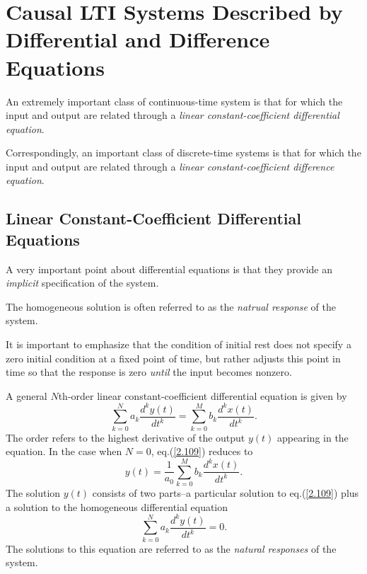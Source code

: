 \documentclass[a4paper,twoside]{book}
\begin{document}
\section{Causal LTI Systems Described by Differential and Difference Equations}

An extremely important class of continuous-time system is that for which the input and output are related through a \textit{linear constant-coefficient differential equation}.

Correspondingly, an important class of discrete-time systems is that for which the input and output are related through a \textit{linear constant-coefficient difference equation}.

\subsection{Linear Constant-Coefficient Differential Equations}

A very important point about differential equations is that they provide an \textit{implicit} specification of the system.

The homogeneous solution is often referred to as the \textit{natrual response} of the system.

It is important to emphasize that the condition of initial rest does not specify a zero initial condition at a fixed point of time, but rather adjusts this point in time so that the response is zero \textit{until} the input becomes nonzero.

A general $N$th-order linear constant-coefficient differential equation is given by
\begin{equation}
    \sum_{k=0}^Na_k\frac{d^ky(t)}{dt^k}=\sum_{k=0}^Mb_k\frac{d^kx(t)}{dt^k}.
    \label{2.109}
\end{equation}
The order refers to the highest derivative of the output $y(t)$ appearing in the equation. In the case when $N=0$, eq.\;(\ref{2.109}) reduces to
\begin{equation}
    y(t) = \frac{1}{a_0}\sum_{k=0}^Mb_k\frac{d^kx(t)}{dt^k}.
    \label{2.110}
\end{equation}
The solution $y(t)$ consists of two parts--a particular solution to eq.\;(\ref{2.109}) plus a solution to the homogeneous differential equation
\begin{equation}
    \sum_{k=0}^Na_k\frac{d^ky(t)}{dt^k}=0.
    \label{2.111}
\end{equation}
The solutions to this equation are referred to as the \textit{natural responses} of the system.
\end{document}
